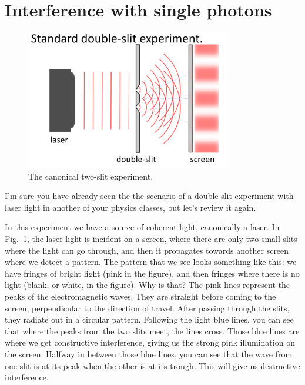 \section{Interference with single photons}
\label{sec:6-4_interference_single_photons}

\begin{figure}[H]
   \centering
    \includegraphics[width=0.8\textwidth]{lesson6/standard_double_slit.pdf}    
        \caption{The canonical two-slit experiment.}
    \label{fig:two-slit}
   
\end{figure}

I'm sure you have already seen the the scenario of a double slit experiment with laser light in another of your physics classes, but let's review it again.

In this experiment we have a source of coherent light, canonically a laser. In Fig.~\ref{fig:two-slit}, the laser light is incident on a screen, where there are only two small slits where the light can go through, and then it propagates towards another screen where we detect a pattern. The pattern that we see looks something like this: we have fringes of bright light (pink in the figure), and then fringes where there is no light (blank, or white, in the figure). Why is that?  The pink lines represent the peaks of the electromagnetic waves. They are straight before coming to the screen, perpendicular to the direction of travel. After passing through the slits, they radiate out in a circular pattern.  Following the light blue lines, you can see that where the peaks from the two slits meet, the lines cross.  Those blue lines are where we get constructive interference, giving us the strong pink illumination on the screen. Halfway in between those blue lines, you can see that the wave from one slit is at its peak when the other is at its trough.  This will give us destructive interference.

